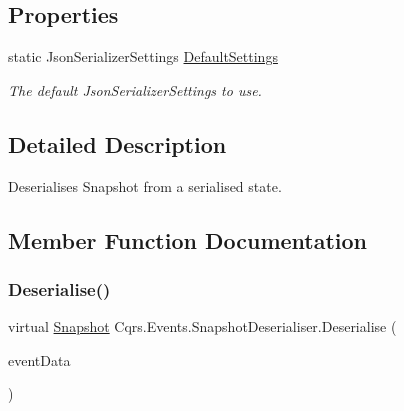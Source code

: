 \subsection*{Properties}
\begin{DoxyCompactItemize}
\item 
static Json\+Serializer\+Settings \hyperlink{classCqrs_1_1Events_1_1SnapshotDeserialiser_a0fb10c8d8409303ba635b1b596449844_a0fb10c8d8409303ba635b1b596449844}{Default\+Settings}
\begin{DoxyCompactList}\small\item\em The default Json\+Serializer\+Settings to use. \end{DoxyCompactList}\end{DoxyCompactItemize}


\subsection{Detailed Description}
Deserialises Snapshot from a serialised state. 



\subsection{Member Function Documentation}
\mbox{\label{classCqrs_1_1Events_1_1SnapshotDeserialiser_a0c2b0f71dd0aad4d4b65d847a6e50902_a0c2b0f71dd0aad4d4b65d847a6e50902}} 
\subsubsection{\texorpdfstring{Deserialise()}{Deserialise()}}
{\footnotesize\ttfamily virtual \hyperlink{classCqrs_1_1Snapshots_1_1Snapshot}{Snapshot} Cqrs.\+Events.\+Snapshot\+Deserialiser.\+Deserialise (\begin{DoxyParamCaption}\item[{\hyperlink{classCqrs_1_1Events_1_1EventData}{Event\+Data}}]{event\+Data }\end{DoxyParamCaption})\hspace{0.3cm}{\ttfamily [virtual]}}



